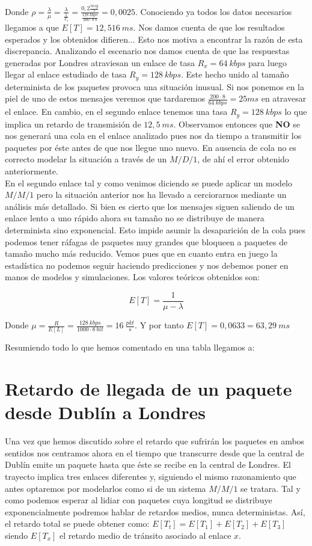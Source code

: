 \documentclass{article}[10pt]
\begin{document}
		Donde $\rho = \frac{\lambda}{\mu} = \frac{\lambda}{\frac{1}{T_s}} = \frac{0,2 \frac{msg}{s}}{\frac{128\ kbps}{200 \cdot 8\ b}} = 0,0025$. Conociendo ya todos los datos necesarios llegamos a que $E[T] = 12,516\ ms$. Nos damos cuenta de que los resultados esperados y los obtenidos difieren... Esto nos motiva a encontrar la razón de esta discrepancia. Analizando el escenario nos damos cuenta de que las respuestas generadas por Londres atraviesan un enlace de tasa $R_x = 64\ kbps$ para luego llegar al enlace estudiado de tasa $R_y = 128\ kbps$. Este hecho unido al tamaño determinista de los paquetes provoca una situación inusual. Si nos ponemos en la piel de uno de estos mensajes veremos que tardaremos $\frac{200 \cdot 8}{64\ kbps} = 25 ms$ en atravesar el enlace. En cambio, en el segundo enlace tenemos una tasa $R_y = 128\ kbps$ lo que implica un retardo de transmisión de $12,5\ ms$. Observamos entonces que \textbf{NO} se nos generará una cola en el enlace analizado pues nos da tiempo a transmitir los paquetes por éste antes de que nos llegue uno nuevo. En ausencia de cola no es correcto modelar la situación a través de un $M/D/1$, de ahí el error obtenido anteriormente.\\

		En el segundo enlace tal y como venimos diciendo se puede aplicar un modelo $M/M/1$ pero la situación anterior nos ha llevado a cerciorarnos mediante un análisis más detallado. Si bien es cierto que los mensajes siguen saliendo de un enlace lento a uno rápido ahora su tamaño no se distribuye de manera determinista sino exponencial. Esto impide asumir la desaparición de la cola pues podemos tener ráfagas de paquetes muy grandes que bloqueen a paquetes de tamaño mucho más reducido. Vemos pues que en cuanto entra en juego la estadística no podemos seguir haciendo predicciones y nos debemos poner en manos de modelos y simulaciones. Los valores teóricos obtenidos son:

		$$E[T] = \frac{1}{\mu - \lambda}$$

		Donde $\mu = \frac{R}{E[L]} = \frac{128\ kbps}{1000 \cdot 8\ bit} = 16\ \frac{pkt}{s}$. Y por tanto $E[T] = 0,0633 = 63,29\ ms$

		Resumiendo todo lo que hemos comentado en una tabla llegamos a:

	\section{Retardo de llegada de un paquete desde Dublín a Londres}
		Una vez que hemos discutido sobre el retardo que sufrirán los paquetes en ambos sentidos nos centramos ahora en el tiempo que transcurre desde que la central de Dublín emite un paquete hasta que éste se recibe en la central de Londres. El trayecto implica tres enlaces diferentes y, siguiendo el mismo razonamiento que antes optaremos por modelarlos como si de un sistema $M/M/1$ se tratara. Tal y como podemos esperar al lidiar con paquetes cuya longitud se distribuye exponencialmente podremos hablar de retardos medios, nunca deterministas. Así, el retardo total se puede obtener como: $E[T_t] = E[T_1] + E[T_2] + E[T_3]$ siendo $E[T_x]$ el retardo medio de tránsito asociado al enlace $x$.\\
\end{document}
